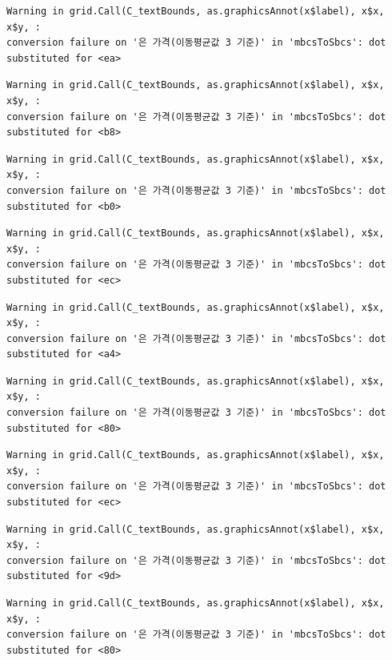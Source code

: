 \documentclass[
  letterpaper,
  DIV=11,
  numbers=noendperiod]{scrreprt}
\begin{document}
\begin{verbatim}
Warning in grid.Call(C_textBounds, as.graphicsAnnot(x$label), x$x, x$y, :
conversion failure on '은 가격(이동평균값 3 기준)' in 'mbcsToSbcs': dot
substituted for <ea>
\end{verbatim}

\begin{verbatim}
Warning in grid.Call(C_textBounds, as.graphicsAnnot(x$label), x$x, x$y, :
conversion failure on '은 가격(이동평균값 3 기준)' in 'mbcsToSbcs': dot
substituted for <b8>
\end{verbatim}

\begin{verbatim}
Warning in grid.Call(C_textBounds, as.graphicsAnnot(x$label), x$x, x$y, :
conversion failure on '은 가격(이동평균값 3 기준)' in 'mbcsToSbcs': dot
substituted for <b0>
\end{verbatim}

\begin{verbatim}
Warning in grid.Call(C_textBounds, as.graphicsAnnot(x$label), x$x, x$y, :
conversion failure on '은 가격(이동평균값 3 기준)' in 'mbcsToSbcs': dot
substituted for <ec>
\end{verbatim}

\begin{verbatim}
Warning in grid.Call(C_textBounds, as.graphicsAnnot(x$label), x$x, x$y, :
conversion failure on '은 가격(이동평균값 3 기준)' in 'mbcsToSbcs': dot
substituted for <a4>
\end{verbatim}

\begin{verbatim}
Warning in grid.Call(C_textBounds, as.graphicsAnnot(x$label), x$x, x$y, :
conversion failure on '은 가격(이동평균값 3 기준)' in 'mbcsToSbcs': dot
substituted for <80>
\end{verbatim}

\begin{verbatim}
Warning in grid.Call(C_textBounds, as.graphicsAnnot(x$label), x$x, x$y, :
conversion failure on '은 가격(이동평균값 3 기준)' in 'mbcsToSbcs': dot
substituted for <ec>
\end{verbatim}

\begin{verbatim}
Warning in grid.Call(C_textBounds, as.graphicsAnnot(x$label), x$x, x$y, :
conversion failure on '은 가격(이동평균값 3 기준)' in 'mbcsToSbcs': dot
substituted for <9d>
\end{verbatim}

\begin{verbatim}
Warning in grid.Call(C_textBounds, as.graphicsAnnot(x$label), x$x, x$y, :
conversion failure on '은 가격(이동평균값 3 기준)' in 'mbcsToSbcs': dot
substituted for <80>
\end{verbatim}
\end{document}
